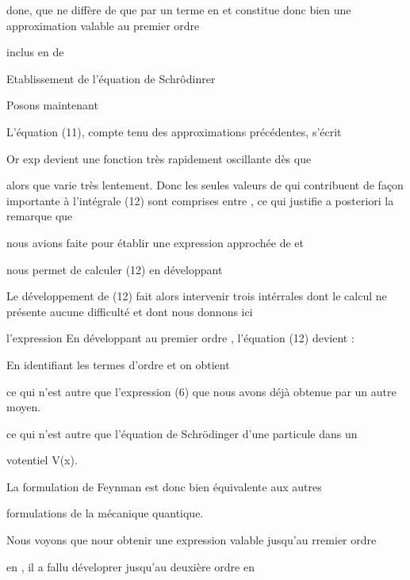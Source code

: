 done, que ne diffère de  que par un terme
en et constitue donc bien une approximation valable au premier ordre

inclus en  de 
%

Etablissement de l'équation de Schrôdinrer

Posons maintenant

L'équation (11), compte tenu des approximations précédentes, s'écrit

Or exp  devient une fonction très rapidement oscillante dès que

 alors que  varie très lentement. Donc les seules
valeurs de  qui contribuent de façon importante à l'intégrale (12) sont
comprises entre , ce qui justifie a posteriori la remarque que

nous avions faite pour établir une expression approchée de  et

nous permet de calculer (12) en développant 

Le développement de (12) fait alors intervenir trois intérrales
dont le calcul ne présente aucune difficulté et dont nous donnons ici

l'expression
%
En développant au premier ordre , l'équation
(12) devient : 

En identifiant les termes d'ordre et  on obtient

ce qui n'est autre que l'expression (6) que nous avons déjà obtenue par
un autre moyen.

ce qui n'est autre que l'équation de Schrödinger d'une particule dans un

votentiel V(x).

La formulation de Feynman est donc bien équivalente aux autres

formulations de la mécanique quantique.

Nous voyons que nour obtenir une expression valable jusqu'au rremier ordre

en , il a fallu déveloprer jusqu'au deuxière ordre en 
%
